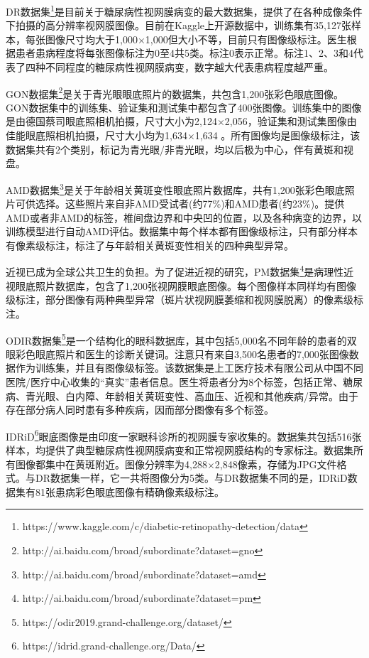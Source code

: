 DR数据集\footnote{https://www.kaggle.com/c/diabetic-retinopathy-detection/data}是目前关于糖尿病性视网膜病变的最大数据集，提供了在各种成像条件下拍摄的高分辨率视网膜图像。目前在Kaggle上开源数据中，训练集有35,127张样本，每张图像尺寸均大于1,000$\times$1,000但大小不等，目前只有图像级标注。医生根据患者患病程度将每张图像标注为0至4共5类。标注0表示正常。标注1、2、3和4代表了四种不同程度的糖尿病性视网膜病变，数字越大代表患病程度越严重。

GON数据集\footnote{http://ai.baidu.com/broad/subordinate?dataset=gno}是关于青光眼眼底照片的数据集，共包含1,200张彩色眼底图像。GON数据集中的训练集、验证集和测试集中都包含了400张图像。训练集中的图像是由德国蔡司眼底照相机拍摄，尺寸大小为2,124$\times$2,056，验证集和测试集图像由佳能眼底照相机拍摄，尺寸大小均为1,634$\times$1,634 。所有图像均是图像级标注，该数据集共有2个类别，标记为青光眼/非青光眼，均以后极为中心，伴有黄斑和视盘。

AMD数据集\footnote{http://ai.baidu.com/broad/subordinate?dataset=amd}是关于年龄相关黄斑变性眼底照片数据库，共有1,200张彩色眼底照片可供选择。这些照片来自非AMD受试者(约77\%)和AMD患者(约23\%)。提供AMD或者非AMD的标签，椎间盘边界和中央凹的位置，以及各种病变的边界，以训练模型进行自动AMD评估。数据集中每个样本都有图像级标注，只有部分样本有像素级标注，标注了与年龄相关黄斑变性相关的四种典型异常。

近视已成为全球公共卫生的负担。为了促进近视的研究，PM数据集\footnote{http://ai.baidu.com/broad/subordinate?dataset=pm}是病理性近视眼底照片数据库，包含了1,200张视网膜眼底图像。每个图像样本同样均有图像级标注，部分图像有两种典型异常（斑片状视网膜萎缩和视网膜脱离）的像素级标注。

ODIR数据集\footnote{https://odir2019.grand-challenge.org/dataset/}是一个结构化的眼科数据库，其中包括5,000名不同年龄的患者的双眼彩色眼底照片和医生的诊断关键词。注意只有来自3,500名患者的7,000张图像数据作为训练集，并且有图像级标签。该数据集是上工医疗技术有限公司从中国不同医院/医疗中心收集的“真实”患者信息。医生将患者分为8个标签，包括正常、糖尿病、青光眼、白内障、年龄相关黄斑变性、高血压、近视和其他疾病/异常。由于存在部分病人同时患有多种疾病，因而部分图像有多个标签。

IDRiD\footnote{https://idrid.grand-challenge.org/Data/}眼底图像是由印度一家眼科诊所的视网膜专家收集的。数据集共包括516张样本，均提供了典型糖尿病性视网膜病变和正常视网膜结构的专家标注。数据集所有图像都集中在黄斑附近。图像分辨率为4,288$\times$2,848像素，存储为JPG文件格式。与DR数据集一样，它一共将图像分为5类。与DR数据集不同的是，IDRiD数据集有81张患病彩色眼底图像有精确像素级标注。

